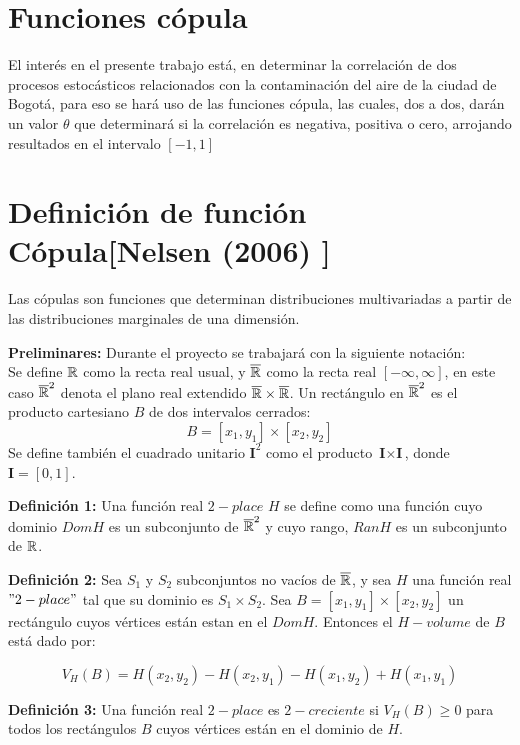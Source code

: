 \section{Funciones cópula}

El interés en el presente trabajo está, en determinar la correlación de dos procesos estocásticos relacionados con la contaminación del aire de la ciudad de Bogotá, para eso se hará uso de las funciones cópula, las cuales, dos a dos, darán un valor $\theta$ que determinará si la correlación es negativa, positiva o cero, arrojando resultados en el intervalo $[-1,1]$ 


\section{Definición de función Cópula[Nelsen (2006) \cite{nelsen}]}

Las cópulas son funciones que determinan distribuciones multivariadas a partir de las distribuciones marginales de una dimensión.

\textbf{Preliminares:}
Durante el proyecto se trabajará con la siguiente notación: 
\\
Se define $\mathbb R$ como la recta real usual, y $\overline{\mathbb R}$ como la recta real $[-\infty,\infty]$, en este caso $\overline{\mathbb R}^2$ denota el plano real extendido $\overline{\mathbb R}\times\overline{\mathbb R}$. Un rectángulo en $\overline{\mathbb R}^2$ es el producto cartesiano $B$ de dos intervalos cerrados: $$B=[x_1,y_1]\times[x_2,y_2]$$  Se define también el cuadrado unitario $\textbf{I}^2$ como el producto $\textbf{I}\times \textbf{I}$, donde $\textbf{I}=[0,1]$.

\vspace{0.5cm}
\textbf{Definición 1:} Una función real $2-place$ $H$ se define como una función cuyo dominio $DomH$ es un subconjunto de $\overline{\mathbb R}^2$ y cuyo rango, $RanH$ es un subconjunto de $\mathbb R$. 
\vspace{0.5cm}

\textbf{Definición 2:} Sea $S_1$ y $S_2$ subconjuntos no vacíos de $\overline{\mathbb R}$, y sea $H$ una función real $"2-place"$ tal que su dominio es $S_1 \times S_2$. Sea $B=[x_1,y_1]\times[x_2,y_2]$ un rectángulo cuyos vértices están estan en el $DomH$. Entonces el $H-volume$ de $B$ está dado por: 

$$V_H(B)= H(x_2,y_2)-H(x_2,y_1)-H(x_1,y_2) +H(x_1,y_1)$$

\vspace{0.4cm}
\textbf{Definición 3:} Una función real $2-place$ es $2-creciente$ si $V_H(B)\geq 0$ para todos los rectángulos $B$ cuyos vértices están en el dominio de $H$. 


